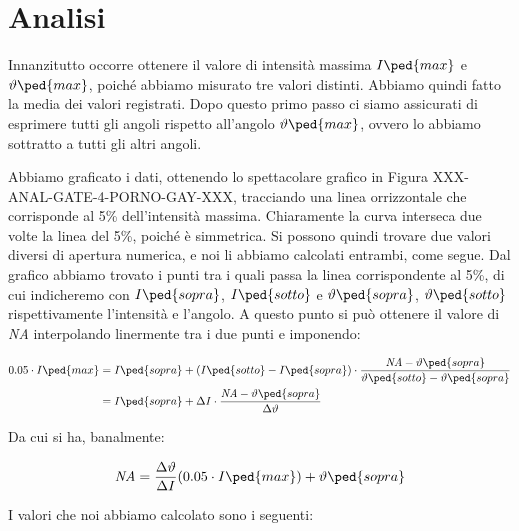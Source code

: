 \section{Analisi}

Innanzitutto occorre ottenere il valore di intensità massima $I\ped{max}$ e $\vartheta\ped{max}$, poiché abbiamo misurato tre valori distinti.
Abbiamo quindi fatto la media dei valori registrati. Dopo questo primo passo ci siamo assicurati di esprimere tutti gli angoli rispetto
all'angolo $\vartheta\ped{max}$, ovvero lo abbiamo sottratto a tutti gli altri angoli.

Abbiamo graficato i dati, ottenendo lo spettacolare grafico in Figura XXX-ANAL-GATE-4-PORNO-GAY-XXX, tracciando una linea orrizzontale
che corrisponde al 5\% dell'intensità massima. Chiaramente la curva interseca due volte la linea del 5\%, poiché è simmetrica.
Si possono quindi trovare due valori diversi di apertura numerica, e noi li abbiamo calcolati entrambi, come segue.
Dal grafico abbiamo trovato i punti tra i quali passa la linea corrispondente al 5\%,
di cui indicheremo con $I\ped{sopra}$, $I\ped{sotto}$ e $\vartheta\ped{sopra}$, $\vartheta\ped{sotto}$ rispettivamente l'intensità e l'angolo.
A questo punto si può ottenere il valore di \emph{NA} interpolando linermente tra i due punti e imponendo:

\begin{equation}
    \begin{split}
        0.05 \cdot I\ped{max} &= I\ped{sopra} + (I\ped{sotto} - I\ped{sopra}) \cdot \frac{\emph{NA} - \vartheta\ped{sopra}}{\vartheta\ped{sotto} - \vartheta\ped{sopra}} \\
                              &= I\ped{sopra} + \Delta I \cdot \frac{\emph{NA} - \vartheta\ped{sopra}}{\Delta \vartheta}
    \end{split}
\end{equation}

Da cui si ha, banalmente:

\begin{equation}
    \emph{NA} = \frac{\Delta \vartheta}{\Delta I} (0.05 \cdot I\ped{max}) + \vartheta\ped{sopra}
\end{equation}

I valori che noi abbiamo calcolato sono i seguenti:


